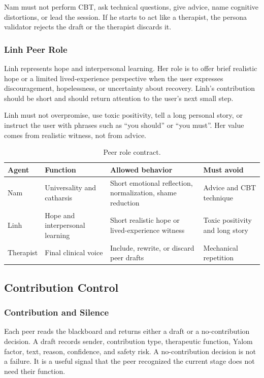 Nam must not perform CBT, ask technical questions, give advice, name cognitive distortions, or lead the session. If he starts to act like a therapist, the persona validator rejects the draft or the therapist discards it.

\subsubsection{Linh Peer Role}

Linh represents hope and interpersonal learning. Her role is to offer brief realistic hope or a limited lived-experience perspective when the user expresses discouragement, hopelessness, or uncertainty about recovery. Linh's contribution should be short and should return attention to the user's next small step.

Linh must not overpromise, use toxic positivity, tell a long personal story, or instruct the user with phrases such as ``you should'' or ``you must''. Her value comes from realistic witness, not from advice.

\begin{table}[tb]
\centering
\caption{Peer role contract.}
\label{tab:peer_roles}
\small
\begin{tabular}{p{}p{}p{}p{}}
\toprule
Agent & Function & Allowed behavior & Must avoid \\
\midrule
Nam & Universality and catharsis & Short emotional reflection, normalization, shame reduction & Advice and CBT technique \\
Linh & Hope and interpersonal learning & Short realistic hope or lived-experience witness & Toxic positivity and long story \\
Therapist & Final clinical voice & Include, rewrite, or discard peer drafts & Mechanical repetition \\
\bottomrule
\end{tabular}
\end{table}

\subsection{Contribution Control}

\subsubsection{Contribution and Silence}

Each peer reads the blackboard and returns either a draft or a no-contribution decision. A draft records sender, contribution type, therapeutic function, Yalom factor, text, reason, confidence, and safety risk. A no-contribution decision is not a failure. It is a useful signal that the peer recognized the current stage does not need their function.

